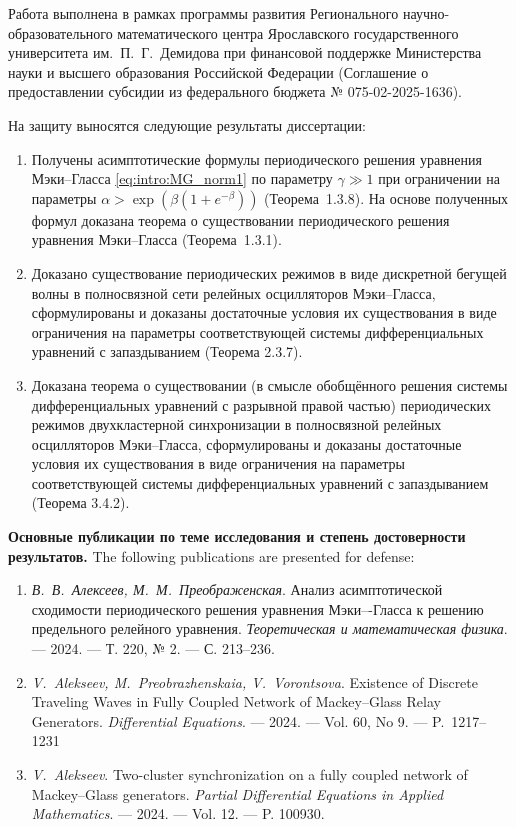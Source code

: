 Работа выполнена в рамках программы развития Регионального научно-образовательного математического центра Ярославского государственного университета им.~П.~Г.~Демидова при финансовой поддержке Министерства науки и высшего образования Российской Федерации (Соглашение о предоставлении субсидии из федерального бюджета № 075-02-2025-1636).

\bigskip

{} На защиту выносятся следующие результаты диссертации:
\begin{enumerate}[beginpenalty=10000] %
	\item Получены асимптотические формулы периодического решения уравнения Мэки--Гласса \eqref{eq:intro:MG_norm1} по параметру $\gamma \gg 1$ при ограничении на параметры $\alpha > \exp\left(\beta(1 + e^{-\beta})\right)$ (Теорема~1.3.8). На основе полученных формул доказана теорема о существовании периодического решения уравнения Мэки--Гласса  (Теорема~1.3.1).
	\item Доказано существование периодических режимов в виде дискретной бегущей волны в полносвязной сети релейных осцилляторов Мэки--Гласса, сформулированы и доказаны достаточные условия их существования в виде ограничения на параметры соответствующей системы дифференциальных уравнений с запаздыванием (Теорема 2.3.7).
	\item Доказана теорема о существовании (в смысле обобщённого решения системы дифференциальных уравнений с разрывной правой частью) периодических режимов двухкластерной синхронизации в полносвязной  релейных осцилляторов Мэки--Гласса, сформулированы и доказаны достаточные условия их существования в виде ограничения на параметры соответствующей системы дифференциальных уравнений с запаздыванием (Теорема 3.4.2).
\end{enumerate}

\bigskip

\textbf{Основные публикации по теме исследования и степень достоверности результатов.} The following publications are presented for defense:
%
\begin{enumerate}[beginpenalty=10000] %
	\item \emph{В.~В.~Алексеев, М.~М.~Преображенская}. Анализ асимптотической сходимости периодического решения уравнения Мэки–-Гласса к решению предельного релейного уравнения. \emph{Теоретическая и математическая физика}. --- 2024. --- Т. 220, № 2. --- С. 213--236. \cite{wosbib1}
	\item \emph{V.~Alekseev, M.~Preobrazhenskaia, V.~Vorontsova}. Existence of Discrete Traveling Waves in Fully Coupled Network of Mackey--Glass Relay Generators. \emph{Differential Equations}. --- 2024. --- Vol. 60, No 9. --- P.~1217--1231 \cite{wosbib2}
	\item \emph{V.~Alekseev}. Two-cluster synchronization on a fully coupled network of Mackey--Glass generators. \emph{Partial Differential Equations in Applied Mathematics}. --- 2024. --- Vol. 12. --- P. 100930. \cite{scbib1}
\end{enumerate}

